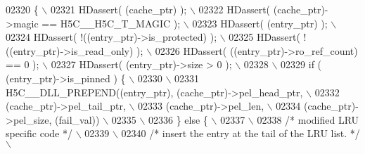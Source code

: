 \begin{DoxyCode}
02320 \textcolor{preprocessor}{\{                                                                          \(\backslash\)}
02321 \textcolor{preprocessor}{    HDassert( (cache\_ptr) );                                               \(\backslash\)}
02322 \textcolor{preprocessor}{    HDassert( (cache\_ptr)->magic == H5C\_\_H5C\_T\_MAGIC );                    \(\backslash\)}
02323 \textcolor{preprocessor}{    HDassert( (entry\_ptr) );                                               \(\backslash\)}
02324 \textcolor{preprocessor}{    HDassert( !((entry\_ptr)->is\_protected) );                              \(\backslash\)}
02325 \textcolor{preprocessor}{    HDassert( !((entry\_ptr)->is\_read\_only) );                              \(\backslash\)}
02326 \textcolor{preprocessor}{    HDassert( ((entry\_ptr)->ro\_ref\_count) == 0 );                          \(\backslash\)}
02327 \textcolor{preprocessor}{    HDassert( (entry\_ptr)->size > 0 );                                     \(\backslash\)}
02328 \textcolor{preprocessor}{                                                                           \(\backslash\)}
02329 \textcolor{preprocessor}{    if ( (entry\_ptr)->is\_pinned ) \{                                        \(\backslash\)}
02330 \textcolor{preprocessor}{                                                                           \(\backslash\)}
02331 \textcolor{preprocessor}{        H5C\_\_DLL\_PREPEND((entry\_ptr), (cache\_ptr)->pel\_head\_ptr,           \(\backslash\)}
02332 \textcolor{preprocessor}{                         (cache\_ptr)->pel\_tail\_ptr,                        \(\backslash\)}
02333 \textcolor{preprocessor}{                         (cache\_ptr)->pel\_len,                             \(\backslash\)}
02334 \textcolor{preprocessor}{                         (cache\_ptr)->pel\_size, (fail\_val))                \(\backslash\)}
02335 \textcolor{preprocessor}{                                                                       \(\backslash\)}
02336 \textcolor{preprocessor}{    \} else \{                                                               \(\backslash\)}
02337 \textcolor{preprocessor}{                                                                           \(\backslash\)}
02338 \textcolor{preprocessor}{        }\textcolor{comment}{/* modified LRU specific code */}\textcolor{preprocessor}{                                   \(\backslash\)}
02339 \textcolor{preprocessor}{                                                                           \(\backslash\)}
02340 \textcolor{preprocessor}{        }\textcolor{comment}{/* insert the entry at the tail of the LRU list. */}\textcolor{preprocessor}{                \(\backslash\)}

\end{DoxyCode}
